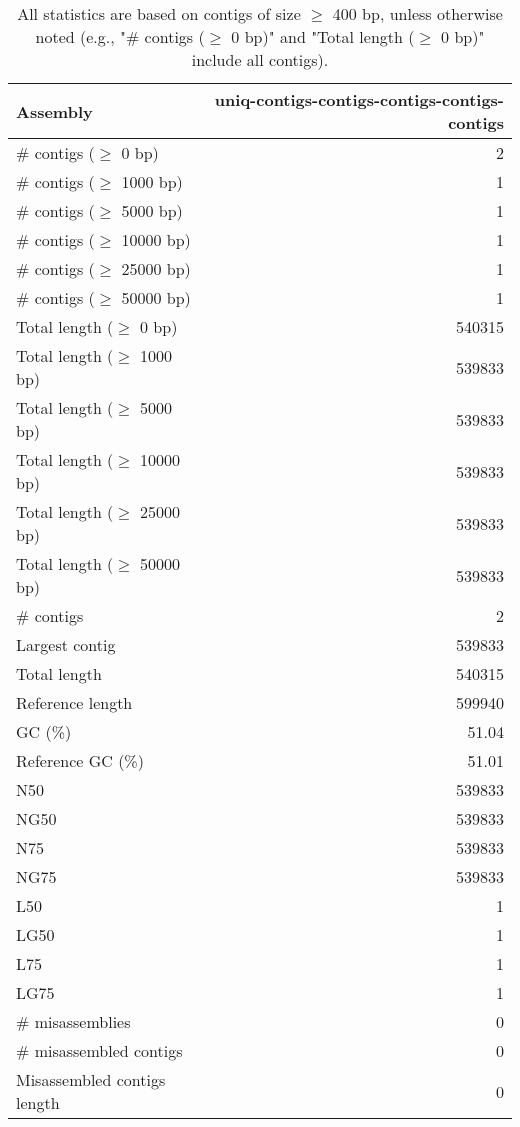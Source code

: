 \documentclass[12pt,a4paper]{article}
\begin{document}
\begin{table}[ht]
\begin{center}
\caption{All statistics are based on contigs of size $\geq$ 400 bp, unless otherwise noted (e.g., "\# contigs ($\geq$ 0 bp)" and "Total length ($\geq$ 0 bp)" include all contigs).}
\begin{tabular}{|l*{1}{|r}|}
\hline
Assembly & uniq-contigs-contigs-contigs-contigs-contigs \\ \hline
\# contigs ($\geq$ 0 bp) & 2 \\ \hline
\# contigs ($\geq$ 1000 bp) & 1 \\ \hline
\# contigs ($\geq$ 5000 bp) & 1 \\ \hline
\# contigs ($\geq$ 10000 bp) & 1 \\ \hline
\# contigs ($\geq$ 25000 bp) & 1 \\ \hline
\# contigs ($\geq$ 50000 bp) & 1 \\ \hline
Total length ($\geq$ 0 bp) & 540315 \\ \hline
Total length ($\geq$ 1000 bp) & 539833 \\ \hline
Total length ($\geq$ 5000 bp) & 539833 \\ \hline
Total length ($\geq$ 10000 bp) & 539833 \\ \hline
Total length ($\geq$ 25000 bp) & 539833 \\ \hline
Total length ($\geq$ 50000 bp) & 539833 \\ \hline
\# contigs & 2 \\ \hline
Largest contig & 539833 \\ \hline
Total length & 540315 \\ \hline
Reference length & 599940 \\ \hline
GC (\%) & 51.04 \\ \hline
Reference GC (\%) & 51.01 \\ \hline
N50 & 539833 \\ \hline
NG50 & 539833 \\ \hline
N75 & 539833 \\ \hline
NG75 & 539833 \\ \hline
L50 & 1 \\ \hline
LG50 & 1 \\ \hline
L75 & 1 \\ \hline
LG75 & 1 \\ \hline
\# misassemblies & 0 \\ \hline
\# misassembled contigs & 0 \\ \hline
Misassembled contigs length & 0 \\ \hline

\end{tabular}
\end{center}
\end{table}
\end{document}
